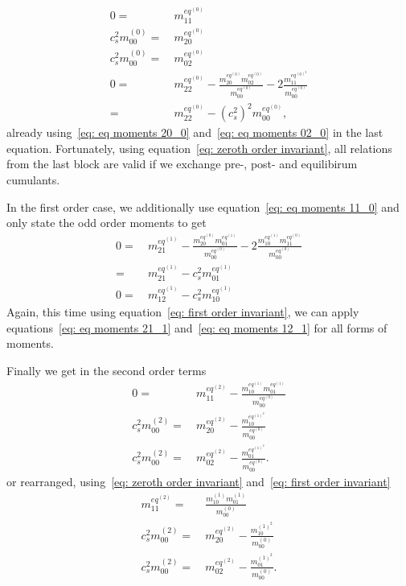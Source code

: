 \begin{align}
  \label{eq: eq moments 11_0}
  0 = &\ m_{11}^{eq^{(0)}}
  \\
  \label{eq: eq moments 20_0}
  c_s^2 m_{00}^{(0)} = &\ m_{20}^{eq^{(0)}}
  \\
  \label{eq: eq moments 02_0}
  c_s^2 m_{00}^{(0)} = &\ m_{02}^{eq^{(0)}}
  \\
  \label{eq: eq moments 22_0}
  0 = &\ m_{22}^{eq^{(0)}} - \frac{ m_{20}^{eq^{(0)}} m_{02}^{eq^{(0)}} }{m_{00}^{eq^{(0)}}} - 2\frac{ m_{11}^{eq^{{(0)}^2}}}{m_{00}^{eq^{(0)}}}
  \\ = &\ m_{22}^{eq^{(0)}} - {(c_s^2)}^2 m_{00}^{eq^{(0)}},
\end{align}
already using~\eqref{eq: eq moments 20_0} and~\eqref{eq: eq moments 02_0} in the last equation.
Fortunately, using equation~\eqref{eq: zeroth order invariant}, all relations from the last block are valid if we exchange pre-, post- and equilibirum cumulants.

In the first order case, we additionally use equation~\eqref{eq: eq moments 11_0} and only state the odd order moments to get
\begin{align}\nonumber
  0 = &\ m_{21}^{eq^{(1)}}
  - \frac{m_{20}^{eq^{(0)}} m_{01}^{eq^{(1)}}}{m_{00}^{eq^{(0)}}}
  - 2\frac{m_{10}^{eq^{(1)}} m_{11}^{eq^{(0)}}}{m_{00}^{eq^{(0)}}}
  \\
  \label{eq: eq moments 21_1}
  = &\ m_{21}^{eq^{(1)}}
  - c_s^2 m_{01}^{eq^{(1)}}
  \\
  \label{eq: eq moments 12_1}
  0 = &\ m_{12}^{eq^{(1)}}
  - c_s^2 m_{10}^{eq^{(1)}}
\end{align}
Again, this time using equation~\eqref{eq: first order invariant}, we can apply equations~\eqref{eq: eq moments 21_1} and~\eqref{eq: eq moments 12_1} for all forms of moments.

Finally we get in the second order terms
\begin{align}
    \label{eq: eq moments 11_2}
    0 =&\ m_{11}^{eq^{(2)}} - \frac{ m_{10}^{eq^{(1)}}m_{01}^{eq^{(1)}}}{m_{00}^{eq^{(0)}}}
    \\
    \label{eq: eq moments 20_2}
    c_s^2 m_{00}^{(2)} =&\ m_{20}^{eq^{(2)}} - \frac{ m_{10}^{eq^{{(1)}^2}}}{m_{00}^{eq^{(0)}}}
    \\
    \label{eq: eq moments 02_2}
    c_s^2 m_{00}^{(2)} =&\ m_{02}^{eq^{(2)}} - \frac{ m_{01}^{eq^{{(1)}^2}}}{m_{00}^{eq^{(0)}}} .
\end{align}
or rearranged, using~\eqref{eq: zeroth order invariant} and~\eqref{eq: first order invariant}
\begin{align}
    m_{11}^{eq^{(2)}} =&\  \frac{ m_{10}^{(1)}m_{01}^{(1)}}{m_{00}^{(0)}}
    \label{eq: eq moments 11_2 rearrange}
    \\
    c_s^2 m_{00}^{(2)} =&\ m_{20}^{eq^{(2)}} - \frac{ m_{10}^{{(1)}^2}}{m_{00}^{(0)}}
    \label{eq: eq moments 20_2 rearrange}
    \\
    \label{eq: eq moments 02_2 rearrange}
    c_s^2 m_{00}^{(2)} =&\ m_{02}^{eq^{(2)}} - \frac{ m_{01}^{{(1)}^2}}{m_{00}^{(0)}} .
\end{align}
